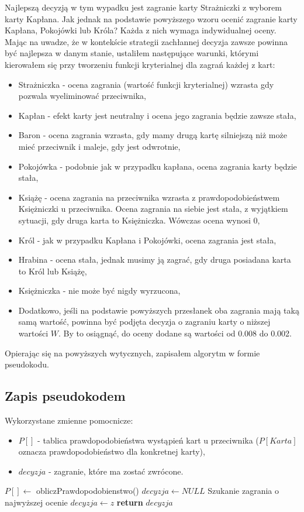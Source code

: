 Najlepszą decyzją w tym wypadku jest zagranie karty Strażniczki z wyborem karty Kapłana. Jak jednak na podstawie powyższego wzoru ocenić zagranie karty Kapłana, Pokojówki lub Króla? Każda z nich wymaga indywidualnej oceny. Mając na uwadze, że w kontekście strategii zachłannej decyzja zawsze powinna być najlepsza w danym stanie, ustaliłem następujące warunki, którymi kierowałem się przy tworzeniu funkcji kryterialnej dla zagrań każdej z kart:
\begin{itemize}
	\item Strażniczka - ocena zagrania (wartość funkcji kryterialnej) wzrasta gdy pozwala wyeliminować przeciwnika,
	\item Kapłan - efekt karty jest neutralny i ocena jego zagrania będzie zawsze stała,
	\item Baron - ocena zagrania wzrasta, gdy mamy drugą kartę silniejszą niż może mieć przeciwnik i maleje, gdy jest odwrotnie,
	\item Pokojówka - podobnie jak w przypadku kapłana, ocena zagrania karty będzie stała,
	\item Książę - ocena zagrania na przeciwnika wzrasta z prawdopodobieństwem Księżniczki u przeciwnika. Ocena zagrania na siebie jest stała, z wyjątkiem sytuacji, gdy druga karta to Księżniczka. Wówczas ocena wynosi 0,
	\item Król - jak w przypadku Kapłana i Pokojówki, ocena zagrania jest stała,
	\item Hrabina - ocena stała, jednak musimy ją zagrać, gdy druga posiadana karta to Król lub Książę,
	\item Księżniczka - nie może być nigdy wyrzucona,
	\item Dodatkowo, jeśli na podstawie powyższych przesłanek oba zagrania mają taką samą wartość, powinna być podjęta decyzja o zagraniu karty o niższej wartości $W$. By to osiągnąć, do oceny dodane są wartości od 0.008 do 0.002.
\end{itemize}
Opierając się na powyższych wytycznych, zapisałem algorytm w formie pseudokodu.
\subsection{Zapis pseudokodem}
Wykorzystane zmienne pomocnicze:
\begin{itemize}
	\item $P[]$ - tablica prawdopodobieństwa wystąpień kart u przeciwnika ($P[Karta]$ oznacza prawdopodobieństwo dla konkretnej karty),
	\item $decyzja$ - zagranie, które ma zostać zwrócone.
\end{itemize}
\begin{algorithmic}[1]
		\State $P[] \gets$ obliczPrawdopodobienstwo()
		\State $ decyzja \gets NULL$ \Comment Szukanie zagrania o najwyższej ocenie
					\State $decyzja \gets z$
				\EndIf
		\EndFor		
		\State \textbf{return} $decyzja$
	\EndFunction
\end{algorithmic}

